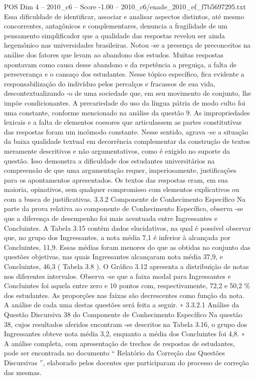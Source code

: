 \begin{textsample}{POS Dim 4 – 2010\_c6 – Score -1.00 – 2010\_c6/enade\_2010\_ef\_f7b5697295.txt}
Essa dificuldade de identificar, associar e analisar aspectos distintos, até mesmo concorrentes, antagônicos e complementares, denuncia a fragilidade de um pensamento simplificador que a qualidade das respostas revelou ser ainda hegemônico nas universidades brasileiras.
Notou -se a presença de preconceitos na análise dos fatores que levam ao abandono dos estudos.
Muitas respostas apontavam como causa desse abandono e da repetência a preguiça, a falta de perseverança e o cansaço dos estudantes.
Nesse tópico específico, fica evidente a responsabilização do indivíduo pelos percalços e fracassos de sua vida, descontextualizando -o de uma sociedade que, em seu movimento de conjunto, lhe impõe condicionantes.
A precariedade do uso da língua pátria de modo culto foi uma constante, conforme mencionado na análise da questão 9.
As impropriedades lexicais e a falta de elementos coesores que articulassem as partes constitutivas das respostas foram um incômodo constante.
Nesse sentido, agrava -se a situação da baixa qualidade textual em decorrência complementar da construção de textos meramente descritivos e não argumentativos, como é exigido no suporte da questão.
Isso demonstra a dificuldade dos estudantes universitários na compreensão de que uma argumentação requer, imperiosamente, justificações para os apontamentos apresentados.
Os textos das respostas eram, em sua maioria, opinativos, sem qualquer compromisso com elementos explicativos ou com a busca de justificativas. 3.3.2 Componente de Conhecimento Específico Na parte da prova relativa ao componente de Conhecimento Específico, observa -se que a diferença de desempenho foi mais acentuada entre Ingressantes e Concluintes.
A Tabela 3.15 contém dados elucidativos, na qual é possível observar que, no grupo dos Ingressantes, a nota média 7,1 é inferior à alcançada por Concluintes, 11,9.
Essas médias foram menores do que as obtidas no conjunto das questões objetivas, nas quais Ingressantes alcançaram nota média 37,9, e Concluintes, 46,3 ( Tabela 3.8 ).
O Gráfico 3.12 apresenta a distribuição de notas nos diferentes intervalos.
Observa -se que a faixa modal para Ingressantes e Concluintes foi aquela entre zero e 10 pontos com, respectivamente, 72,2 e 50,2 \% dos estudantes.
As proporções nas faixas são decrescentes como função da nota.
A análise de cada uma destas questões será feita a seguir. ∗ 3.3.2.1 Análise da Questão Discursiva 38 do Componente de Conhecimento Específico Na questão 38, cujos resultados aferidos encontram -se descritos na Tabela 3.16, o grupo dos Ingressantes obteve nota média 3,2, enquanto a média dos Concluintes foi 4,8. ∗ A análise completa, com apresentação de trechos de respostas de estudantes, pode ser encontrada no documento “ Relatório da Correção das Questões Discursivas ”, elaborado pelos docentes que participaram do processo de correção das mesmas.

\end{textsample}
